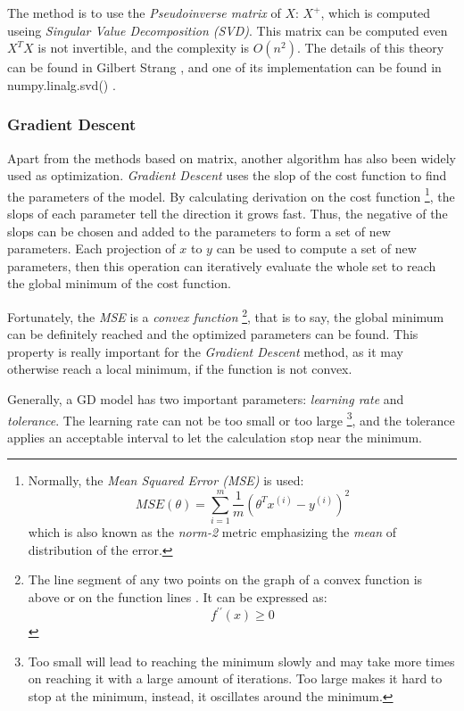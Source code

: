 \documentclass[12pt,a4paper]{report}
\begin{document}
        The method is to use the \emph{Pseudoinverse matrix} of $X$: $X^+$, which is computed useing \emph{Singular Value Decomposition (SVD)}. This matrix can be computed even $X^TX$ is not invertible, and the complexity is $O(n^2)$. The details of this theory can be found in Gilbert Strang \cite{book:linearalgebra}, and one of its implementation can be found in numpy.linalg.svd() \cite{website:numsvd}.

        \subsubsection{Gradient Descent}
        Apart from the methods based on matrix, another algorithm has also been widely used as optimization. \emph{Gradient Descent} uses the slop of the cost function to find the parameters of the model. By calculating derivation on the cost function \footnote{Normally, the \emph{Mean Squared Error (MSE)} is used: $$MSE(\theta)=\sum_{i=1}^m\frac{1}{m}(\theta^T x^{(i)} - y^{(i)})^2$$ which is also known as the \emph{norm-2} metric emphasizing the \emph{mean} of distribution of the error.}, the slops of each parameter tell the direction it grows fast. Thus, the negative of the slops can be chosen and added to the parameters to form a set of new parameters. Each projection of $x$ to $y$ can be used to compute a set of new parameters, then this operation can iteratively evaluate the whole set to reach the global minimum of the cost function.

        Fortunately, the \emph{MSE} is a \emph{convex function} \footnote{The line segment of any two points on the graph of a convex function is above or on the function lines \cite{website:wikiconvexfunction}. It can be expressed as: $$f^{\prime \prime} (x) \geq 0$$}, that is to say, the global minimum can be definitely reached and the optimized parameters can be found. This property is really important for the \emph{Gradient Descent} method, as it may otherwise reach a local minimum, if the function is not convex.

        Generally, a GD model has two important parameters: \emph{learning rate} and \emph{tolerance}. The learning rate can not be too small or too large \footnote{Too small will lead to reaching the minimum slowly and may take more times on reaching it with a large amount of iterations. Too large makes it hard to stop at the minimum, instead, it oscillates around the minimum.}, and the tolerance applies an acceptable interval to let the calculation stop near the minimum.
        
\end{document}
